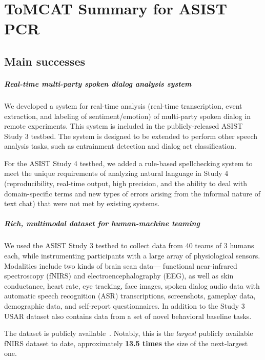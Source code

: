 \documentclass[11pt,article,oneside]{memoir}
\begin{document}
\chapter*{ToMCAT Summary for ASIST PCR}

\section{Main successes}

\paragraph{Real-time multi-party spoken dialog analysis system}

We developed a system for real-time analysis (real-time transcription, event
extraction, and labeling of sentiment/emotion) of multi-party spoken dialog in
remote experiments. This system is included in the publicly-released ASIST
Study 3 testbed. The system is designed to be
extended to perform other speech analysis tasks, such as entrainment detection
and dialog act classification.

For the ASIST Study 4 testbed, we added a rule-based spellchecking system to
meet the unique requirements of analyzing natural language in Study 4
(reproducibility, real-time output, high precision, and the ability to deal
with domain-specific terms and new types of errors arising from
the informal nature of text chat) that were not met by existing systems.

\paragraph{Rich, multimodal dataset for human-machine teaming} We used the
ASIST Study 3 testbed to collect data from 40 teams of 3 humans each, while
instrumenting participants with a large array of physiological sensors.
Modalities include two kinds of brain scan data— functional near-infrared
spectroscopy (fNIRS) and electroencephalography (EEG), as well as skin
conductance, heart rate, eye tracking, face images, spoken dialog audio data
with automatic speech recognition (ASR) transcriptions, screenshots, gameplay
data, demographic data, and self-report questionnaires. In addition to the
Study 3 USAR dataset also contains data from a set of novel behavioral baseline
tasks.

The dataset is publicly available~\citep{pyarelal2023the}. Notably, this is
the \emph{largest} publicly available fNIRS dataset to date, approximately
\textbf{13.5 times} the size of the next-largest one.
\end{document}
